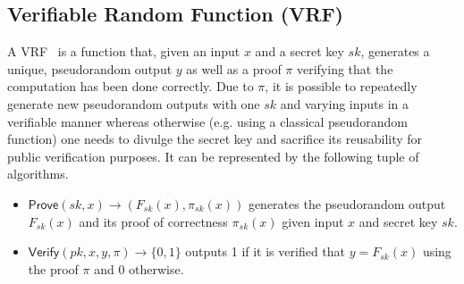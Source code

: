 
\subsection{Verifiable Random Function (VRF)}
\label{appendix:vrf}
A VRF~\cite{micali1999verifiable,dodis2005verifiable} is a function that, given an input $x$ and a secret key $sk$, generates a unique, pseudorandom output $y$ as well as a proof $\pi$ verifying that the computation has been done correctly. Due to $\pi$, it is possible to repeatedly generate new pseudorandom outputs with one $sk$ and varying inputs in a verifiable manner whereas otherwise (e.g. using a classical pseudorandom function) one needs to divulge the secret key and sacrifice its reusability for public verification purposes. It can be represented by the following tuple of algorithms.
\begin{itemize}
\item $\mathsf{Prove}(sk, x) \rightarrow (F_{sk}(x), \pi_{sk}(x))$ generates the pseudorandom output $F_{sk}(x)$ and its proof of correctness $\pi_{sk}(x)$ given input $x$ and secret key $sk$.
\item $\mathsf{Verify}(pk, x, y, \pi) \rightarrow \{0, 1\}$ outputs 1 if it is verified that $y = F_{sk}(x)$ using the proof $\pi$ and 0 otherwise.
\end{itemize}


